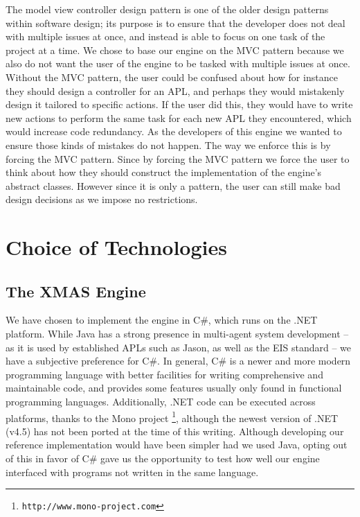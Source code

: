 The model view controller design pattern is one of the older design
patterns within software design; its purpose is to ensure that the
developer does not deal with multiple issues at once, and instead
is able to focus on one task of the project at a time. We chose to
base our engine on the MVC pattern because we also do not want the
user of the engine to be tasked with multiple issues at once. Without
the MVC pattern, the user could be confused about how for instance
they should design a controller for an APL, and perhaps they would
mistakenly design it tailored to specific actions. If the user did
this, they would have to write new actions to perform the same task
for each new APL they encountered, which would increase code redundancy.
As the developers of this engine we wanted to ensure those kinds of
mistakes do not happen. The way we enforce this is by forcing the
MVC pattern. Since by forcing the MVC pattern we force the user to
think about how they should construct the implementation of the engine\textquoteright{}s
abstract classes. However since it is only a pattern, the user can
still make bad design decisions as we impose no restrictions. 


\section{Choice of Technologies}


\subsection*{The XMAS Engine}

We have chosen to implement the engine in C\#, which runs on the .NET
platform. While Java has a strong presence in multi-agent system development
-- as it is used by established APLs such as Jason, as well as the
EIS standard -- we have a subjective preference for C\#. In general,
C\# is a newer and more modern programming language with better facilities
for writing comprehensive and maintainable code, and provides some
features usually only found in functional programming languages. Additionally,
.NET code can be executed across platforms, thanks to the Mono project%
\footnote{\texttt{http://www.mono-project.com}%
}, although the newest version of .NET (v4.5) has not been ported at
the time of this writing. Although developing our reference implementation
would have been simpler had we used Java, opting out of this in favor
of C\# gave us the opportunity to test how well our engine interfaced
with programs not written in the same language. 


